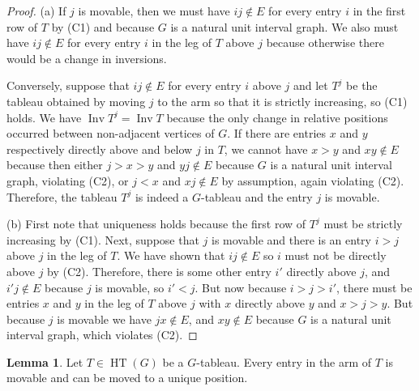 \documentclass[10pt,a4paper]{amsart}
\theoremstyle{definition}
\newtheorem{lemma}[theorem]{Lemma}
\theoremstyle{remark}
\numberwithin{equation}{section}
\DeclareMathOperator{\Inv}{Inv}
\DeclareMathOperator{\HT}{HT}
\begin{document}
\begin{proof}
(a) If $j$ is movable, then we must have $ij\notin E$ for every entry $i$ in the first row of $T$ by (C1) and because $G$ is a natural unit interval graph. We also must have $ij\notin E$ for every entry $i$ in the leg of $T$ above $j$ because otherwise there would be a change in inversions. 

Conversely, suppose that $ij\notin E$ for every entry $i$ above $j$ and let $T^j$ be the tableau obtained by moving $j$ to the arm so that it is strictly increasing, so (C1) holds. We have $\Inv T^j=\Inv T$ because the only change in relative positions occurred between non-adjacent vertices of $G$. If there are entries $x$ and $y$ respectively directly above and below $j$ in $T$, we cannot have $x>y$ and $xy\notin E$ because then either $j>x>y$ and $yj\notin E$ because $G$ is a natural unit interval graph, violating (C2), or $j<x$  and $xj\notin E$ by assumption, again violating (C2). Therefore, the tableau $T^j$ is indeed a $G$-tableau and the entry $j$ is movable.

(b) First note that uniqueness holds because the first row of $T^j$ must be strictly increasing by (C1).  Next, suppose that $j$ is movable and there is an entry $i>j$ above $j$ in the leg of $T$. We have shown that $ij\notin E$ so $i$ must not be directly above $j$ by (C2). Therefore, there is some other entry $i'$ directly above $j$, and $i'j\not\in E$ because $j$ is movable, so $i'<j$. But now because $i>j>i'$, there must be entries $x$ and $y$ in the leg of $T$ above $j$ with $x$ directly above $y$ and $x>j>y$. But because $j$ is movable we have $jx\notin E$, and $xy\notin E$ because $G$ is a natural unit interval graph, which violates (C2).
\end{proof}

\begin{lemma} \label{lem:armtoleg}
Let $T\in\HT(G)$ be a $G$-tableau. Every entry in the arm of $T$ is movable and can be moved to a unique position.
\end{lemma}
\end{document}
